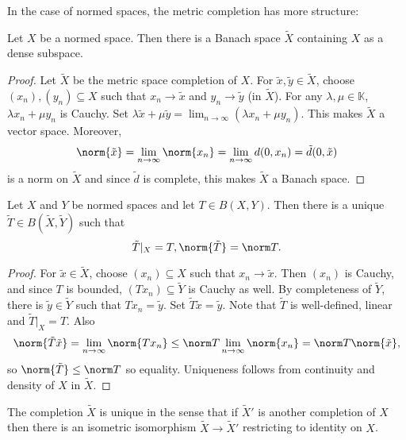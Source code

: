 \documentclass[a4paper]{article}
\newcommand{\K}{{\mathbb{K}}} %
\begin{document}
In the case of normed spaces, the metric completion has more structure:

\begin{theorem}
  Let \(X\) be a normed space. Then there is a Banach space \(\tilde X\) containing \(X\) as a dense subspace.
\end{theorem}

\begin{proof}
  Let \(\tilde X\) be the metric space completion of \(X\). For \(\tilde x, \tilde y \in \tilde X\), choose \((x_n), (y_n) \subseteq X\) such that \(x_n \to \tilde x\) and \(y_n \to \tilde y\) (in \(\tilde X\)). For any \(\lambda, \mu \in \K\), \(\lambda x_n + \mu y_n\) is Cauchy. Set \(\lambda \tilde x + \mu \tilde y = \lim_{n \to \infty} (\lambda x_n + \mu y_n)\). This makes \(\tilde X\) a vector space. Moreover,
  \[
    \norm{\tilde x} = \lim_{n \to \infty} \norm{x_n} = \lim_{n \to \infty} d(0, x_n) = \tilde d (0, \tilde x)
  \]
  is a norm on \(\tilde X\) and since \(\tilde d\) is complete, this makes \(\tilde X\) a Banach space.
\end{proof}

\begin{proposition}
  Let \(X\) and \(Y\) be normed spaces and let \(T \in B(X, Y)\). Then there is a unique \(\tilde T \in B(\tilde X, \tilde Y)\) such that
  \[
    \tilde T|_X = T, \norm{\tilde T} = \norm T.
  \]
\end{proposition}

\begin{proof}
  For \(\tilde x \in \tilde X\), choose \((x_n) \subseteq X\) such that \(x_n \to \tilde x\). Then \((x_n)\) is Cauchy, and since \(T\) is bounded, \((Tx_n) \subseteq \tilde Y\) is Cauchy as well. By completeness of \(\tilde Y\), there is \(\tilde y \in \tilde Y\) such that \(Tx_n = \tilde y\). Set \(\tilde T \tilde x = \tilde y\). Note that \(\tilde T\) is well-defined, linear and \(\tilde T|_X = T\). Also
  \[
    \norm{\tilde T \tilde x} = \lim_{n \to \infty} \norm{T x_n} \leq \norm T \lim_{n \to \infty} \norm{x_n} = \norm T \norm{\tilde x},
  \]
  so \(\norm{\tilde T} \leq \norm T\) so equality. Uniqueness follows from continuity and density of \(X\) in \(\tilde X\).
\end{proof}

\begin{remark}
  The completion \(\tilde X\) is unique in the sense that if \(\tilde X'\) is another completion of \(X\) then there is an isometric isomorphism \(\tilde X \to \tilde X'\) restricting to identity on \(X\).
\end{remark}
\end{document}
